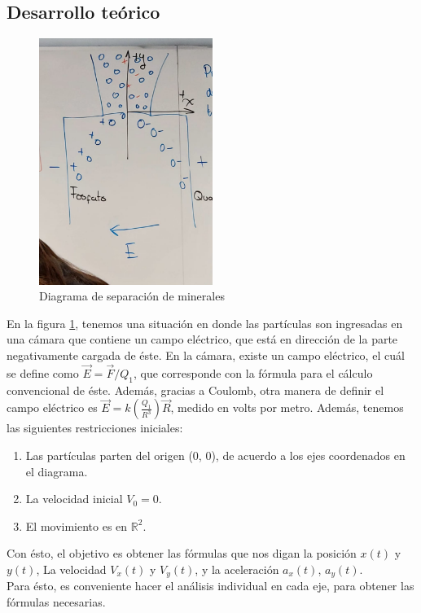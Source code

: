 \documentclass[12pt, letterpaper]{report}
\begin{document}
\subsection*{Desarrollo teórico}
\begin{figure}[H]
    \centering
    \includegraphics[height = 8cm]{2024-04-17_DiagramaSeparacionMinerales.jpeg}
    \caption{Diagrama de separación de minerales}
    \label{fig:fig1}
\end{figure}
En la figura \ref{fig:fig1}, tenemos una situación en donde las partículas son ingresadas en una cámara que contiene un campo eléctrico, que está en dirección de la parte 
negativamente cargada de éste. En la cámara, existe un campo eléctrico, el cuál se define como $\vec{E} = \vec{F}/Q_1$, que corresponde con la fórmula 
para el cálculo convencional de éste. Además, gracias a Coulomb, otra manera de definir el campo eléctrico es $\vec{E} = k(\frac{Q_1}{R^3})\vec{R}$, medido en volts por metro. 
Además, tenemos las siguientes restricciones iniciales: 
\begin{enumerate}
\item Las partículas parten del origen (0, 0), de acuerdo a los ejes coordenados en el diagrama. 
\item La velocidad inicial $V_0 = 0$. 
\item El movimiento es en $\mathbb{R}^2$. 
\end{enumerate}
Con ésto, el objetivo es obtener las fórmulas que nos digan la posición $x(t)$ y $y(t)$, La velocidad $V_x(t)$ y $V_y(t)$, 
y la aceleración $a_x(t)$, $a_y(t)$. \\

Para ésto, es conveniente hacer el análisis individual en cada eje, para obtener las fórmulas necesarias. 
\end{document}
